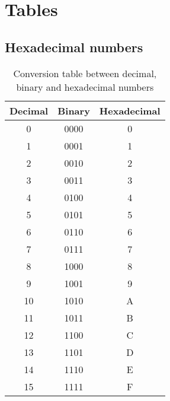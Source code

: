 \chapter{Tables}

\section{Hexadecimal numbers}
\begin{table}[h]
    \begin{center}
	\caption{Conversion table between decimal, binary and hexadecimal numbers}
	\label{tab:DecBinHex}

	\bigskip

	\begin{tabular}{ccc}
	\toprule
	    Decimal & Binary & Hexadecimal \\
	\midrule
	     0 & 0000 & 0  \\
	     1 & 0001 & 1 \\
	     2 & 0010 & 2 \\
	     3 & 0011 & 3 \\
	     4 & 0100 & 4 \\
	     5 & 0101 & 5 \\
	     6 & 0110 & 6 \\
	     7 & 0111 & 7 \\
	     8 & 1000 & 8 \\
	     9 & 1001 & 9 \\
	    10 & 1010 & A \\
	    11 & 1011 & B \\
	    12 & 1100 & C \\
	    13 & 1101 & D \\
	    14 & 1110 & E \\
	    15 & 1111 & F \\
	\bottomrule
	\end{tabular}
    \end{center}
\end{table}


